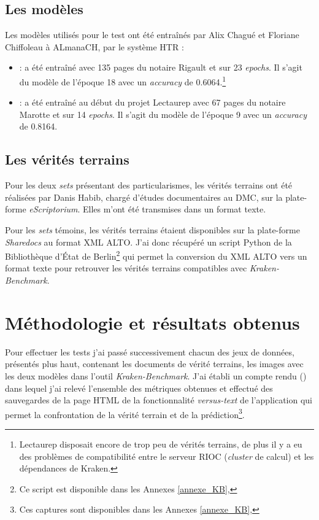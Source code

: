 \subsection{Les modèles} 
Les modèles utilisés pour le test ont été entraînés par Alix Chagué et Floriane Chiffoleau à ALmanaCH, par le système HTR :

\begin{itemize}
    \item {} : a été entraîné avec 135 pages du notaire Rigault et sur 23 \textit{epochs}. Il s'agit du modèle de l'époque 18 avec un \textit{accuracy} de 0.6064.\footnote{Lectaurep disposait encore de trop peu de vérités terrains, de plus il y a eu des problèmes de compatibilité entre le serveur RIOC (\textit{cluster} de calcul) et les dépendances de Kraken.}  
    \item {} : a été entraîné au début du projet Lectaurep avec 67 pages du notaire Marotte et sur 14 \textit{epochs}. Il s'agit du modèle de l'époque 9 avec un \textit{accuracy} de 0.8164.
\end{itemize}

\subsection{Les vérités terrains}

Pour les deux \textit{sets} présentant des particularismes, les vérités terrains ont été réalisées par Danis Habib, chargé d'études documentaires au DMC, sur la plate-forme \textit{eScriptorium}. Elles m'ont été transmises dans un format texte.

Pour les \textit{sets} témoins, les vérités terrains étaient disponibles sur la plate-forme \textit{Sharedocs} au format XML ALTO. J'ai donc récupéré un script Python de la Bibliothèque d'État de Berlin\footnote{Ce script est disponible dans les Annexes \ref{annexe_KB}, } qui permet la conversion du XML ALTO vers un format texte pour retrouver les vérités terrains compatibles avec \textit{Kraken-Benchmark}. 
\newpage
\section{Méthodologie et résultats obtenus}

Pour effectuer les tests j'ai passé successivement chacun des jeux de données, présentés plus haut, contenant les documents de vérité terrains, les images avec les deux modèles dans l'outil \textit{Kraken-Benchmark}. J'ai établi un compte rendu () dans lequel j'ai relevé l'ensemble des métriques obtenues et effectué des sauvegardes de la page HTML de la fonctionnalité \textit{versus-text} de l'application qui permet la confrontation de la vérité terrain et de la prédiction\footnote{Ces captures sont disponibles dans les Annexes \ref{annexe_KB}, }.

